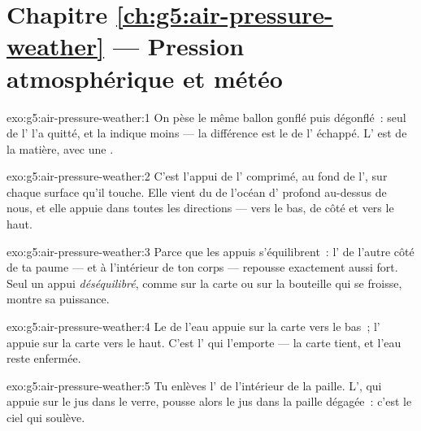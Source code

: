 \section*{Chapitre \ref{ch:g5:air-pressure-weather} --- Pression atmosphérique et météo}

\begin{solution}{exo:g5:air-pressure-weather:1}
On pèse le même ballon gonflé puis dégonflé~: seul de l' l'a
quitté, et la  indique moins --- la différence est le  de
l' échappé. L' est de la matière, avec une .
\end{solution}

\begin{solution}{exo:g5:air-pressure-weather:2}
C'est l'appui de l' comprimé, au fond de l', sur chaque
surface qu'il touche. Elle vient du  de l'océan d' profond
au-dessus de nous, et elle appuie dans toutes les directions --- vers
le bas, de côté et vers le haut.
\end{solution}

\begin{solution}{exo:g5:air-pressure-weather:3}
Parce que les appuis s'équilibrent~: l' de l'autre côté de ta
paume --- et à l'intérieur de ton corps --- repousse exactement aussi
fort. Seul un appui \emph{déséquilibré}, comme sur la carte ou sur la
bouteille qui se froisse, montre sa puissance.
\end{solution}

\begin{solution}{exo:g5:air-pressure-weather:4}
Le  de l'eau appuie sur la carte vers le bas~; l'
appuie sur la carte vers le haut. C'est l' qui l'emporte
--- la carte tient, et l'eau reste enfermée.
\end{solution}

\begin{solution}{exo:g5:air-pressure-weather:5}
Tu enlèves l'\emph{} de l'intérieur de la paille. L',
qui appuie sur le jus dans le verre, pousse alors le jus dans la
paille dégagée~: c'est le ciel qui soulève.
\end{solution}

